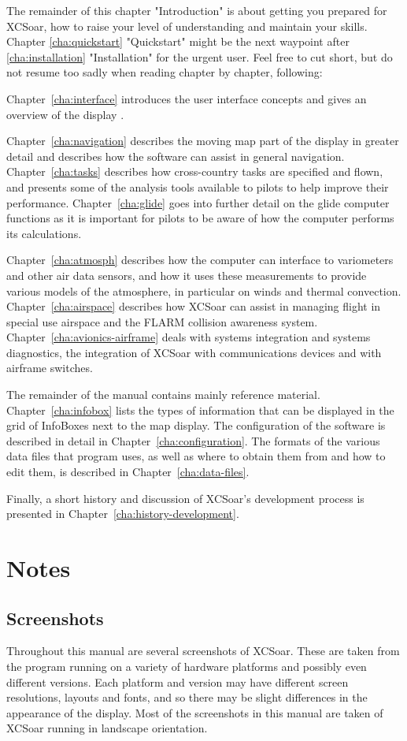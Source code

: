 The remainder of this chapter "Introduction" is about getting you prepared for 
XCSoar, how to raise your level of understanding and maintain your skills. 
Chapter \ref{cha:quickstart} "Quickstart" might be the next waypoint after 
\ref{cha:installation} "Installation" for the urgent user. Feel free to cut 
short, but do not resume too sadly when reading chapter by chapter, following:

Chapter~\ref{cha:interface} introduces the user interface
concepts and gives an overview of the display .

Chapter~\ref{cha:navigation} describes the moving map part of the
display in greater detail and describes how the software can assist in
general navigation.  Chapter~\ref{cha:tasks} describes how
cross-country tasks are specified and flown, and presents some of the
analysis tools available to pilots to help improve their performance.
Chapter~\ref{cha:glide} goes into further detail on the glide computer
functions as it is important for pilots to be aware of how the
computer performs its calculations.

Chapter~\ref{cha:atmosph} describes how the computer can interface to
variometers and other air data sensors, and how it uses these
measurements to provide various models of the atmosphere, in
particular on winds and thermal convection.
Chapter~\ref{cha:airspace} describes how XCSoar can assist in managing
flight in special use airspace and the FLARM collision awareness
system.  Chapter~\ref{cha:avionics-airframe} deals with systems
integration and systems diagnostics, the integration of XCSoar with
communications devices and with airframe switches.

The remainder of the manual contains mainly reference material.
Chapter~\ref{cha:infobox} lists the types of information that can be
displayed in the grid of InfoBoxes next to the map display.  The
configuration of the software is described in detail in
Chapter~\ref{cha:configuration}.  The formats of the various data
files that program uses, as well as where to obtain them from and how
to edit them, is described in Chapter~\ref{cha:data-files}.

Finally, a short history and discussion of XCSoar's development
process is presented in Chapter~\ref{cha:history-development}.

\section{Notes}

\subsection*{Screenshots}
Throughout this manual are several screenshots of XCSoar. These are
taken from the program running on a variety of hardware platforms and possibly
even different versions. Each platform and version may have different screen
resolutions, layouts and fonts, and so there may be slight differences in the
appearance of the display. Most of the screenshots in this manual are taken of
XCSoar running in landscape orientation.

